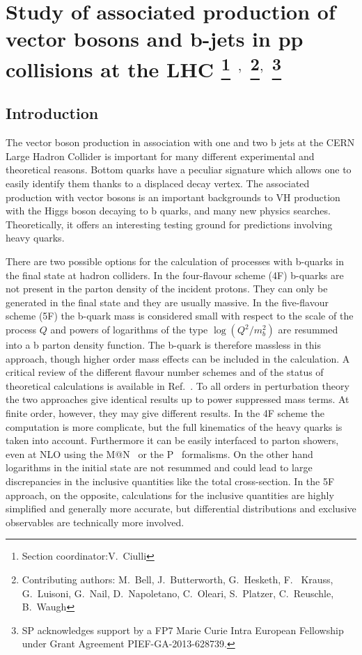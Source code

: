 \documentclass[11pt]{cernrep}
\makeatletter
\newcommand{\Powheg}{P\protect\scalebox{0.8}{OWHEG}\xspace}
\newcommand{\MCatNLO}{M\protect\scalebox{0.8}{C}@N\protect\scalebox{0.8}{LO}\xspace}
\makeatother
\begin{document}
\section{Study of associated production of vector bosons and b-jets in
  pp collisions at the LHC  \protect\footnote{Section
    coordinator:V.~Ciulli} $^{,}$ \protect\footnote{Contributing authors:
    M.~Bell, J.~Butterworth,
    G.~Hesketh, F. ~Krauss, G.~Luisoni, G.~Nail, D.~Napoletano,
    C.~Oleari, S.~Platzer, C.~Reuschle, B.~Waugh}$^{,}$
  \protect\footnote{SP acknowledges support by a FP7 Marie Curie Intra European
Fellowship under Grant Agreement PIEF-GA-2013-628739.} \label{thisLH_Vbb}}

\subsection{Introduction}

The vector boson production in association with one and two b jets at the
CERN Large Hadron Collider is important for many different experimental and
theoretical reasons. Bottom quarks have a peculiar signature which allows one
to easily identify them thanks to a displaced decay vertex. The associated
production with vector bosons is an important backgrounds to VH production
with the Higgs boson decaying to b quarks, and many new physics
searches. Theoretically, it offers an interesting testing ground for
predictions involving heavy quarks.

There are two possible options for the calculation of processes with b-quarks
in the final state at hadron colliders. In the four-flavour scheme (4F)
b-quarks are not present in the parton density of the incident protons. They
can only be generated in the final state and they are usually massive. In the
five-flavour scheme (5F) the b-quark mass is considered small with respect to
the scale of the process $Q$ and powers of logarithms of the type
$\log(Q^2/m_b^2)$ are resummed into a b parton density function. The
b-quark is therefore massless in this approach, though higher order mass
effects can be included in the calculation. A critical review of the
different flavour number schemes and of the status of theoretical
calculations is available in Ref.~\cite{Maltoni:2012pa}. To all orders
in perturbation theory the two approaches give identical results up to
power suppressed mass terms. At finite order, however, they may give
different results. In the 4F scheme the computation is more
complicate, but the full kinematics of the heavy quarks is taken into
account. Furthermore it can be easily interfaced to parton showers, even at
NLO using the \MCatNLO~\cite{Frixione:2002ik} or the
\Powheg~\cite{Nason:2004rx} formalisms.  On the other hand logarithms in the
initial state are not resummed and could lead to large discrepancies in the
inclusive quantities like the total cross-section. In the 5F approach, on the
opposite, calculations for the inclusive quantities are highly simplified and
generally more accurate, but differential distributions and exclusive
observables are technically more involved.
\end{document}
